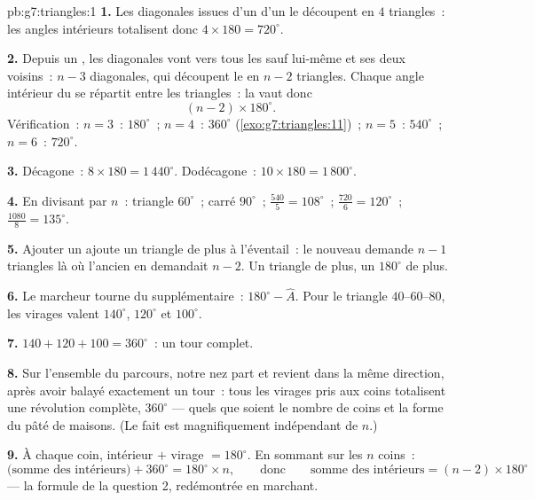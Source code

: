 \begin{solution}{pb:g7:triangles:1}
\textbf{1.} Les diagonales issues d'un  d'un  le
découpent en $4$ triangles~: les angles intérieurs totalisent donc
$4 \times 180 = 720^\circ$.

\textbf{2.} Depuis un , les diagonales vont vers tous les
 sauf lui-même et ses deux voisins~: $n - 3$ diagonales, qui
découpent le  en $n - 2$ triangles. Chaque angle intérieur du
 se répartit entre les triangles~: la  vaut donc
\[
(n - 2) \times 180^\circ .
\]
Vérification~: $n = 3$~: $180^\circ$~; $n = 4$~: $360^\circ$
(\cref{exo:g7:triangles:11})~; $n = 5$~: $540^\circ$~; $n = 6$~:
$720^\circ$.

\textbf{3.} Décagone~: $8 \times 180 = 1\,440^\circ$. Dodécagone~:
$10 \times 180 = 1\,800^\circ$.

\textbf{4.} En divisant par $n$~: triangle $60^\circ$~; carré
$90^\circ$~;  $\frac{540}{5} = 108^\circ$~; 
$\frac{720}{6} = 120^\circ$~; 
$\frac{1080}{8} = 135^\circ$.

\textbf{5.} Ajouter un  ajoute un triangle de plus à
l'éventail~: le nouveau  demande $n - 1$ triangles là où
l'ancien en demandait $n - 2$. Un triangle de plus, un $180^\circ$
de plus.

\textbf{6.} Le marcheur tourne du supplémentaire~:
$180^\circ - \widehat A$. Pour le triangle $40$--$60$--$80$, les
virages valent $140^\circ$, $120^\circ$ et $100^\circ$.

\textbf{7.} $140 + 120 + 100 = 360^\circ$~: un tour complet.

\textbf{8.} Sur l'ensemble du parcours, notre nez part et revient
dans la même direction, après avoir balayé exactement un tour~:
tous les virages pris aux coins totalisent une révolution complète,
$360^\circ$ --- quels que soient le nombre de coins et la forme du
pâté de maisons. (Le fait est magnifiquement indépendant de $n$.)

\textbf{9.} À chaque coin, intérieur $+$ virage $= 180^\circ$. En
sommant sur les $n$ coins~:
\[
\text{(somme des intérieurs)} + 360^\circ = 180^\circ \times n,
\qquad\text{donc}\qquad
\text{somme des intérieurs} = (n - 2) \times 180^\circ
\]
--- la formule de la question 2, redémontrée en marchant.


\end{solution}
